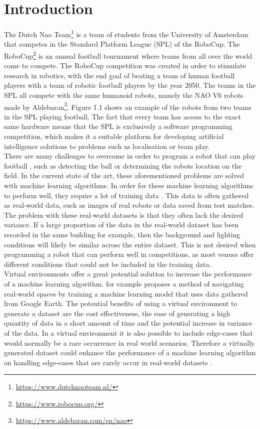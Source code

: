 \documentclass{uva-inf-bachelor-thesis}
\begin{document}
\chapter{Introduction}
    The Dutch Nao Team\footnote{\url{https://www.dutchnaoteam.nl/}} is a team of students from the University of Amsterdam that competes in the Standard Platform League (SPL) of the RoboCup. The RoboCup\footnote{\url{https://www.robocup.org/}} is an annual football tournament where teams from all over the world come to compete. The RoboCup competition was created in order to stimulate research in robotics, with the end goal of beating a team of human football players with a team of robotic football players by the year 2050. The teams in the SPL all compete with the same humanoid robots, namely the NAO V6 robots made by Aldebaran\footnote{\url{https://www.aldebaran.com/en/nao}}. Figure 1.1 shows an example of the robots from two teams in the SPL playing football. The fact that every team has access to the exact same hardware means that the SPL is exclusively a software programming competition, which makes it a suitable platform for developing artificial intelligence solutions to problems such as localisation or team play.
    \hfill \break \\
    There are many challenges to overcome in order to program a robot that can play football \cite{challenges}, such as detecting the ball or determining the robots location on the field. In the current state of the art, these aforementioned problems are solved with machine learning algorithms. In order for these machine learning algorithms to perform well, they require a lot of training data \cite{KornblithShlensLe2019}. This data is often gathered as real-world data, such as images of real robots or data saved from test matches. The problem with these real-world datasets is that they often lack the desired variance. If a large proportion of the data in the real-world dataset has been recorded in the same building for example, then the background and lighting conditions will likely be similar across the entire dataset. This is not desired when programming a robot that can perform well in competitions, as most venues offer different conditions that could not be included in the training data.
    \hfill \break \\
    Virtual environments offer a great potential solution to increase the performance of a machine learning algorithm. \cite{virt} for example proposes a method of navigating real-world spaces by training a machine learning model that uses data gathered from Google Earth. The potential benefits of using a virtual environment to generate a dataset are the cost effectiveness, the ease of generating a high quantity of data in a short amount of time and the potential increase in variance of the data. In a virtual environment it is also possible to include edge-cases that would normally be a rare occurrence in real world scenarios. Therefore a virtually generated dataset could enhance the performance of a machine learning algorithm on handling edge-cases that are rarely occur in real-world datasets \cite{edge}.   
\end{document}
